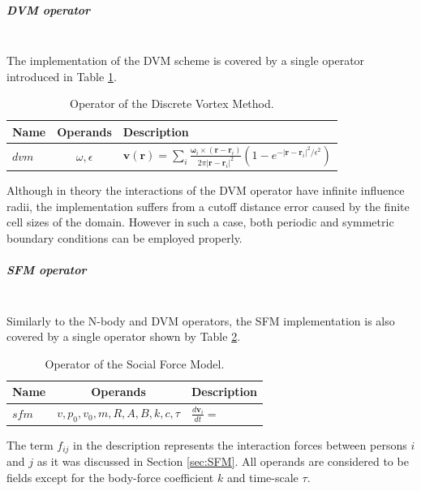 \documentclass[a4paper,12pt,openany]{book}
\newcommand{\mysubparagraph}[1]{\subparagraph{#1}\mbox{}\\}
\theoremstyle{break}
\begin{document}
\mysubparagraph{DVM operator}
The implementation of the DVM scheme is covered by a single operator introduced in Table \ref{tbl:DVM_op}. 
\begin{table} [h!]
\begin{center}
\caption{Operator of the Discrete Vortex Method.} \label{tbl:DVM_op}
\begin{tabular}{ l c l }
\toprule[1.5pt]
\bf Name & \bf Operands & \bf Description \\ 
\midrule
$dvm$ & $\omega, \epsilon$ & $\textbf{v}(\textbf{r})=\sum_i\frac{\bm{\omega}_i\times (\textbf{r}-\textbf{r}_i)}{2\pi \vert\textbf{r}-\textbf{r}_i\vert^2}(1-e^{-\vert\textbf{r}-\textbf{r}_i\vert^2/\epsilon^2})$ \\
\bottomrule[1.25pt]
\end{tabular}
\end{center}
\end{table}
Although in theory the interactions of the DVM operator have infinite influence radii, the implementation suffers from a cutoff distance error caused by the finite cell sizes of the domain. However in such a case, both periodic and symmetric boundary conditions can be employed properly.



\mysubparagraph{SFM operator}
Similarly to the N-body and DVM operators, the SFM implementation is also covered by a single operator shown by Table \ref{tbl:SFM_op}.
\begin{table} [h!]
\begin{center}
\caption{Operator of the Social Force Model.} \label{tbl:SFM_op}
\begin{tabular}{ l c l }
\toprule[1.5pt]
\bf Name & \bf Operands & \bf Description \\ 
\midrule
$sfm$ & $v,p_0,v_0,m,R,A,B,k,c,\tau$ & $\frac{d\textbf{v}_i}{dt}=$ \\
\bottomrule[1.25pt]
\end{tabular}
\end{center}
\end{table}
The term $f_{ij}$ in the description represents the interaction forces between persons $i$ and $j$ as it was discussed in Section \ref{sec:SFM}. All operands are considered to be fields except for the body-force coefficient $k$ and time-scale $\tau$.
\end{document}
